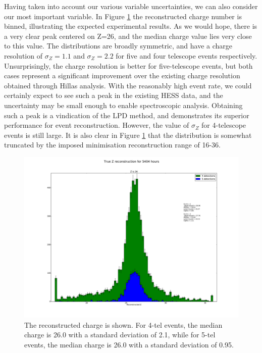 \documentclass[11pt]{article}
\begin{document}
Having taken into account our various variable uncertainties, we can also consider our most important variable. In Figure \ref{fig:rawZ} the reconstructed charge number is binned, illustrating the expected experimental results. As we would hope, there is a very clear peak centered on Z=26, and the median charge value lies very close to this value. The distributions are broadly symmetric, and have a charge resolution of $\sigma_{Z} = 1.1$ and $\sigma_{Z} = 2.2$ for five and four telescope events respectively. Unsurprisingly, the charge resolution is better for five-telescope events, but both cases represent a significant improvement over the existing charge resolution obtained through Hillas analysis. With the reasonably high event rate, we could certainly expect to see such a peak in the existing HESS data, and the uncertainty may be small enough to enable spectroscopic analysis. Obtaining such a peak is a vindication of the LPD method, and demonstrates its superior performance for event reconstruction. However, the value of $\sigma_{Z}$ for 4-telescope events is still large. It is also clear in Figure \ref{fig:rawZ} that the distribution is somewhat truncated by the imposed minimisation reconstruction range of 16-36. 

\begin{figure}
\begin{center}
\includegraphics[width=\textwidth]{rawZ}
\caption{The reconstructed charge is shown. For 4-tel events, the median charge is 26.0 with a standard deviation of 2.1, while for 5-tel events, the median charge is 26.0 with a standard deviation of 0.95.}
\label{fig:rawZ}
\end{center}
\end{figure} 
\end{document}
